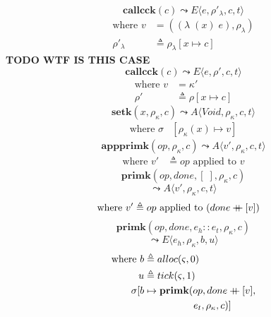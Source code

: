\documentclass[12pt,draft]{article}
\newcommand\mdoubleplus{\ensuremath{\mathbin{+\mkern-9mu+}}}
\newcommand{\singlelamsyn}[2]{(\lambda\;(#1)\;#2)}
\begin{document}
\begin{multicols*}{2}
\[
\textbf{callcck}(c)
\leadsto
E\langle
e , \rho'_{\lambda} , c , t
\rangle
\]
\vspace{-13mm}
\begin{align*}
\text{where } v &= (\singlelamsyn{x}{e} , \rho_{\lambda}) \\
\rho'_{\lambda} &\triangleq \rho_{\lambda}[x \mapsto c]
\end{align*}
\textbf{ TODO WTF IS THIS CASE} \\ \vspace{-4mm}
\[
\textbf{callcck}(c)
\leadsto
E\langle
e , \rho' , c , t
\rangle
\]
\vspace{-10mm}
\begin{align*}
\text{where } v &= \kappa' \\
\rho' &\triangleq \rho[x \mapsto c]
\end{align*}
\[
\textbf{setk}(x, \rho_{\kappa}, c)
\leadsto
A\langle
\textit{Void} , \rho_{\kappa} , c , t
\rangle
\]
\vspace{-10mm}
\begin{align*}
\text{where } \sigma&[\rho_{\kappa}(x) \mapsto v]
\end{align*}
\[
\textbf{appprimk}(op, \rho_{\kappa}, c)
\leadsto
A\langle
v' , \rho_{\kappa} , c , t
\rangle
\]
\vspace{-12mm}
\begin{align*}
\text{where } v' &\triangleq op \text{ applied to } v
\end{align*}
\[
\textbf{primk}(op, done, [\;], \rho_{\kappa}, c)
\]
\vspace{-7mm}
\[
\leadsto
A\langle
v' , \rho_{\kappa} , c , t
\rangle
\]
\vspace{-12mm}
\begin{align*}
\text{where } v' &\triangleq op \text{ applied to } (done \mdoubleplus [v])
\end{align*}
\[
\textbf{primk}(op, done, e_h::e_t,\rho_{\kappa}, c)
\]
\vspace{-7mm}
\[
\leadsto
E\langle
e_h , \rho_{\kappa} , b , u
\rangle
\]
\vspace{-11mm}
\begin{align*}
\text{where } b &\triangleq alloc(\varsigma, 0) \\
u &\triangleq tick(\varsigma, 1) \\
\sigma[b &\mapsto \textbf{primk}(op, done \mdoubleplus [v], \\
&\;\;\;\;\;\;\;\;\;\;\;\;\;\;\;\;\;\; e_t, \rho_{\kappa}, c)]
\end{align*}
\end{multicols*}
\newpage
\end{document}
